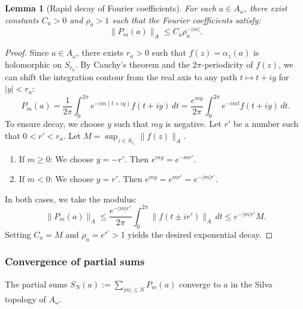 \documentclass[11pt,reqno]{amsart}
\newtheorem{lemma}[theorem]{Lemma}
\theoremstyle{definition}
\numberwithin{equation}{section}
\begin{document}
\begin{lemma}[Rapid decay of Fourier coefficients]\label{5.11}
For each $a \in A_{\omega}$, there exist constants $C_a > 0$ and $\rho_a > 1$ such that the Fourier coefficients satisfy:
\[
\|P_m(a)\|_A \le C_a \rho_a^{-|m|}.
\]
\end{lemma}

\begin{proof}
Since $a \in A_{\omega}$, there exists $r_a > 0$ such that $f(z) = \alpha_z(a)$ is holomorphic on $S_{r_a}$. By Cauchy’s theorem and the $2\pi$-periodicity of $f(z)$, we can shift the integration contour from the real axis to any path $t \mapsto t + iy$ for $|y| < r_a$:
\[
P_m(a) = \frac{1}{2\pi} \int_0^{2\pi} e^{-im(t+iy)}f(t+iy) \, dt = \frac{e^{my}}{2\pi} \int_0^{2\pi} e^{-imt}f(t+iy) \, dt.
\]
To ensure decay, we choose $y$ such that $my$ is negative. Let $r'$ be a number such that $0 < r' < r_a$. Let $M = \sup_{z \in S_{r_a}}\|f(z)\|_A$.
\begin{enumerate}
    \item If $m \ge 0$: We choose $y = -r'$. Then $e^{my} = e^{-mr'}$.
    \item If $m < 0$: We choose $y = r'$. Then $e^{my} = e^{mr'} = e^{-|m|r'}$.
\end{enumerate}
In both cases, we take the modulus:
\[
\|P_m(a)\|_A \le \frac{e^{-|m|r'}}{2\pi} \int_0^{2\pi} \|f(t \pm ir')\|_A \, dt \le e^{-|m|r'}M.
\]
Setting $C_a = M$ and $\rho_a = e^{r'} > 1$ yields the desired exponential decay.
\end{proof}

\subsubsection{Convergence of partial sums}
The partial sums $S_N(a) := \sum_{|m| \le N} P_m(a)$ converge to $a$ in the Silva topology of $A_{\omega}$.
\end{document}
